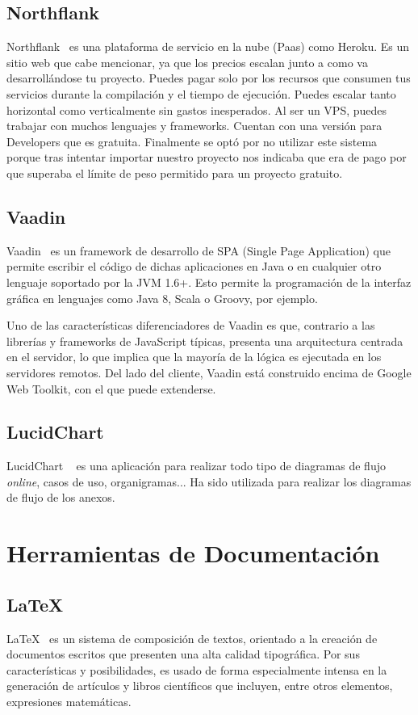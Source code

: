 \subsection{Northflank}
Northflank~\cite{Northflank} es una plataforma de servicio en la nube (Paas) como Heroku. Es un sitio web que cabe mencionar, ya que los precios escalan junto a como va desarrollándose tu proyecto. Puedes pagar solo por los recursos que consumen tus servicios durante la compilación y el tiempo de ejecución. Puedes escalar tanto horizontal como verticalmente sin gastos inesperados. Al ser un VPS, puedes trabajar con muchos lenguajes y frameworks. Cuentan con una versión para Developers que es gratuita. 
Finalmente se optó por no utilizar este sistema porque tras intentar importar nuestro proyecto nos indicaba que era de pago por que superaba el límite de peso permitido para un proyecto gratuito.

\subsection{Vaadin}
Vaadin~\cite{Vaadin} es un framework de desarrollo de SPA (Single Page Application) que permite escribir el código de dichas aplicaciones en Java o en cualquier otro lenguaje soportado por la JVM 1.6+. Esto permite la programación de la interfaz gráfica en lenguajes como Java 8, Scala o Groovy, por ejemplo.

Uno de las características diferenciadores de Vaadin es que, contrario a las librerías y frameworks de JavaScript típicas, presenta una arquitectura centrada en el servidor, lo que implica que la mayoría de la lógica es ejecutada en los servidores remotos. Del lado del cliente, Vaadin está construido encima de Google Web Toolkit, con el que puede extenderse.

\subsection{LucidChart}

LucidChart ~\cite{LucidChart} es una aplicación para realizar todo tipo de diagramas de flujo \emph{online}, casos de uso, organigramas... 
Ha sido utilizada para realizar los diagramas de flujo de los anexos.

\section{Herramientas de Documentación}

\subsection{\LaTeX} 
\LaTeX~\cite{latex} es un sistema de composición de textos, orientado a la creación de documentos escritos que presenten una alta calidad tipográfica. Por sus características y posibilidades, es usado de forma especialmente intensa en la generación de artículos y libros científicos que incluyen, entre otros elementos, expresiones matemáticas.
 

